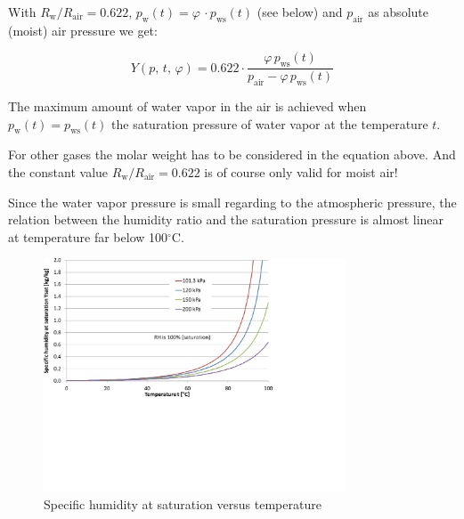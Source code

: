 \documentclass[11pt,a4paper,english,twoside]{scrreprt}
\newcommand{\gradC}{${}^\circ$C}      %
\begin{document}
With $R_\text{w} / R_\text{air} = 0.622$, $p_\text{w}(t) = \varphi\,\cdot p_\text{ws}(t)$ (see below) and $p_\text{air}$ as absolute (moist) air pressure we get:

\begin{equation}
  \label{eqn:Yphi}
  Y(p,\,t,\,\varphi) = 0.622 \cdot \frac{\varphi\, p_\text{ws}(t) }{p_\text{air} - \varphi\, p_\text{ws}(t)}
\end{equation}


The maximum amount of water vapor in the air is achieved when $p_\text{w}(t) =p_\text{ws}(t)$ the saturation pressure of water vapor at the temperature $t$.

For other gases the molar weight has to be considered in the equation above. And the constant value $R_\text{w} / R_\text{air} = 0.622$ is of course only valid for moist air!

Since the water vapor pressure is small regarding to the atmospheric pressure, the relation between the humidity ratio and the saturation pressure is almost linear at temperature far below 100\gradC.

\begin{figure}
  \centering
  \includegraphics*[width=0.8\textwidth,angle=0]{FCF_Diag_Y.pdf}
  \caption[Specific humidity at saturation versus temperature]{Specific humidity at saturation versus temperature}
\end{figure}
\end{document}
